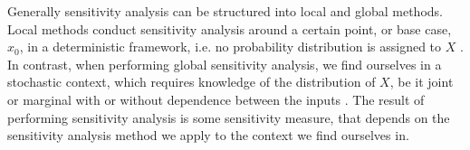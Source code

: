 Generally sensitivity analysis can be structured into local and global methods. Local methods conduct sensitivity analysis around a certain point, or base case, $x_0$, in a deterministic framework, i.e. no probability distribution is assigned to $X$ \citep{BP16}. In contrast, when performing global sensitivity analysis, we find ourselves in a stochastic context, which requires knowledge of the distribution of $X$, be it joint or marginal with or without dependence between the inputs \citep{ST02}. The result of performing sensitivity analysis is some sensitivity measure, that depends on the sensitivity analysis method we apply to the context we find ourselves in.









